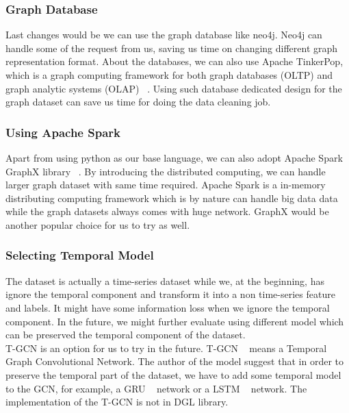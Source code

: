 \subsubsection{Graph Database}

Last changes would be we can use the graph database like neo4j. Neo4j can handle some of the request from us, saving us time on changing different graph representation format. About the databases, we can also use Apache TinkerPop, which is a graph computing framework for both graph databases (OLTP) and graph analytic systems (OLAP) ~\cite{Gremlin}. Using such database dedicated design for the graph dataset can save us time for doing the data cleaning job.\\

\subsubsection{Using Apache Spark}

Apart from using python as our base language, we can also adopt Apache Spark GraphX library ~\cite{10.1145/2934664}. By introducing the distributed computing, we can handle larger graph dataset with same time required. Apache Spark is a in-memory distributing computing framework which is by nature can handle big data data while the graph datasets always comes with huge network. GraphX would be another popular choice for us to try as well.

\subsubsection{Selecting Temporal Model}
The dataset is actually a time-series dataset while we, at the beginning, has ignore the temporal component and transform it into a non time-series feature and labels. It might have some information loss when we ignore the temporal component. In the future, we might further evaluate using different model which can be preserved the temporal component of the dataset.\\

T-GCN is an option for us to try in the future. T-GCN ~\cite{8809901} means a Temporal Graph Convolutional Network. The author of the model suggest that in order to preserve the temporal part of the dataset, we have to add some temporal model to the GCN, for example, a GRU ~\cite{cho2014learning} network or a LSTM ~\cite{LSTM} network. The implementation of the T-GCN is not in DGL library.\\

